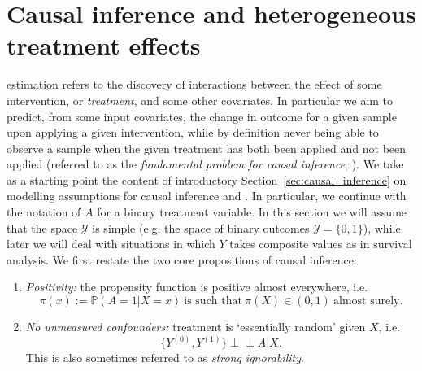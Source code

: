 \documentclass[../thesis.tex]{subfiles}
\begin{document}
\section{Causal inference and heterogeneous treatment effects \label{sec:hte}}
 estimation refers to the discovery of interactions between the effect of some intervention, or \emph{treatment}, and some other covariates. In particular we aim to predict, from some input covariates, the change in outcome for a given sample upon applying a given intervention, while by definition never being able to observe a sample when the given treatment has both been applied and not been applied (referred to as the \emph{fundamental problem for causal inference}; \citealp{holland_statistics_1986}). We take as a starting point the content of introductory Section~\ref{sec:causal_inference} on modelling assumptions for causal inference and . In particular, we continue with the notation of $A$ for a binary treatment variable. In this section we will assume that the space $\mathcal{Y}$ is simple (e.g. the space of binary outcomes $\mathcal{Y} = \{0,1\}$), while later we will deal with situations in which $Y$ takes composite values as in survival analysis. We first restate the two core propositions of causal inference:
\begin{enumerate}
    \item \emph{Positivity:} the propensity function is positive almost everywhere, i.e. 
    \[\pi(x) := \mathbb{P}(A=1 | X = x) \  \text{is such that} \ \pi(X) \in (0,1) \ \text{almost surely.}\]
    \item \emph{No unmeasured confounders:} treatment is `essentially random' given $X$, i.e.
    \[\{Y^{(0)}, Y^{(1)}\} \perp\!\!\!\perp A | X. \]
    This is also sometimes referred to as \emph{strong ignorability}.
\end{enumerate}


\end{document}
